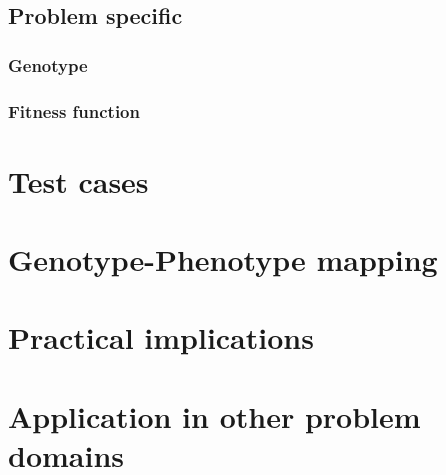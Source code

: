 \documentclass[12pt]{article}
\begin{document}
		\subsection{Problem specific}\label{sec:specific}
		
	\subsubsection{Genotype}\label{sec:geno}
	\subsubsection{Fitness function}\label{sec:fitness}
\section{Test cases}\label{sec:test}
\section{Genotype-Phenotype mapping}\label{sec:mapping}
\section{Practical implications}\label{sec:implications}
\section{Application in other problem domains}\label{sec:applications}
\end{document}
